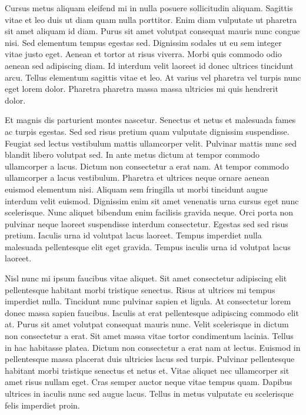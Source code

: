 \documentclass[11pt,a4paper]{article}
\begin{document}
Cursus metus aliquam eleifend mi in nulla posuere sollicitudin aliquam. Sagittis vitae et leo duis ut diam quam nulla porttitor. Enim diam vulputate ut pharetra sit amet aliquam id diam. Purus sit amet volutpat consequat mauris nunc congue nisi. Sed elementum tempus egestas sed. Dignissim sodales ut eu sem integer vitae justo eget. Aenean et tortor at risus viverra. Morbi quis commodo odio aenean sed adipiscing diam. Id interdum velit laoreet id donec ultrices tincidunt arcu. Tellus elementum sagittis vitae et leo. At varius vel pharetra vel turpis nunc eget lorem dolor. Pharetra pharetra massa massa ultricies mi quis hendrerit dolor.

Et magnis dis parturient montes nascetur. Senectus et netus et malesuada fames ac turpis egestas. Sed sed risus pretium quam vulputate dignissim suspendisse. Feugiat sed lectus vestibulum mattis ullamcorper velit. Pulvinar mattis nunc sed blandit libero volutpat sed. In ante metus dictum at tempor commodo ullamcorper a lacus. Dictum non consectetur a erat nam. At tempor commodo ullamcorper a lacus vestibulum. Pharetra et ultrices neque ornare aenean euismod elementum nisi. Aliquam sem fringilla ut morbi tincidunt augue interdum velit euismod. Dignissim enim sit amet venenatis urna cursus eget nunc scelerisque. Nunc aliquet bibendum enim facilisis gravida neque. Orci porta non pulvinar neque laoreet suspendisse interdum consectetur. Egestas sed sed risus pretium. Iaculis urna id volutpat lacus laoreet. Tempus imperdiet nulla malesuada pellentesque elit eget gravida. Tempus iaculis urna id volutpat lacus laoreet.

Nisl nunc mi ipsum faucibus vitae aliquet. Sit amet consectetur adipiscing elit pellentesque habitant morbi tristique senectus. Risus at ultrices mi tempus imperdiet nulla. Tincidunt nunc pulvinar sapien et ligula. At consectetur lorem donec massa sapien faucibus. Iaculis at erat pellentesque adipiscing commodo elit at. Purus sit amet volutpat consequat mauris nunc. Velit scelerisque in dictum non consectetur a erat. Sit amet massa vitae tortor condimentum lacinia. Tellus in hac habitasse platea. Dictum non consectetur a erat nam at lectus. Euismod in pellentesque massa placerat duis ultricies lacus sed turpis. Pulvinar pellentesque habitant morbi tristique senectus et netus et. Vitae aliquet nec ullamcorper sit amet risus nullam eget. Cras semper auctor neque vitae tempus quam. Dapibus ultrices in iaculis nunc sed augue lacus. Tellus in metus vulputate eu scelerisque felis imperdiet proin.
\end{document}
